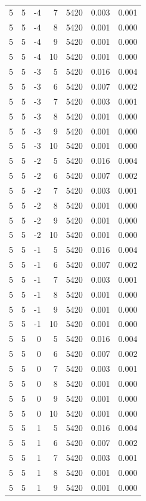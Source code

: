 \begin{table}
\begin{tabular}{rrrrrrr}
5 & 5 & -4 & 7 & 5420 & 0.003 & 0.001 \\
5 & 5 & -4 & 8 & 5420 & 0.001 & 0.000 \\
5 & 5 & -4 & 9 & 5420 & 0.001 & 0.000 \\
5 & 5 & -4 & 10 & 5420 & 0.001 & 0.000 \\
5 & 5 & -3 & 5 & 5420 & 0.016 & 0.004 \\
5 & 5 & -3 & 6 & 5420 & 0.007 & 0.002 \\
5 & 5 & -3 & 7 & 5420 & 0.003 & 0.001 \\
5 & 5 & -3 & 8 & 5420 & 0.001 & 0.000 \\
5 & 5 & -3 & 9 & 5420 & 0.001 & 0.000 \\
5 & 5 & -3 & 10 & 5420 & 0.001 & 0.000 \\
5 & 5 & -2 & 5 & 5420 & 0.016 & 0.004 \\
5 & 5 & -2 & 6 & 5420 & 0.007 & 0.002 \\
5 & 5 & -2 & 7 & 5420 & 0.003 & 0.001 \\
5 & 5 & -2 & 8 & 5420 & 0.001 & 0.000 \\
5 & 5 & -2 & 9 & 5420 & 0.001 & 0.000 \\
5 & 5 & -2 & 10 & 5420 & 0.001 & 0.000 \\
5 & 5 & -1 & 5 & 5420 & 0.016 & 0.004 \\
5 & 5 & -1 & 6 & 5420 & 0.007 & 0.002 \\
5 & 5 & -1 & 7 & 5420 & 0.003 & 0.001 \\
5 & 5 & -1 & 8 & 5420 & 0.001 & 0.000 \\
5 & 5 & -1 & 9 & 5420 & 0.001 & 0.000 \\
5 & 5 & -1 & 10 & 5420 & 0.001 & 0.000 \\
5 & 5 & 0 & 5 & 5420 & 0.016 & 0.004 \\
5 & 5 & 0 & 6 & 5420 & 0.007 & 0.002 \\
5 & 5 & 0 & 7 & 5420 & 0.003 & 0.001 \\
5 & 5 & 0 & 8 & 5420 & 0.001 & 0.000 \\
5 & 5 & 0 & 9 & 5420 & 0.001 & 0.000 \\
5 & 5 & 0 & 10 & 5420 & 0.001 & 0.000 \\
5 & 5 & 1 & 5 & 5420 & 0.016 & 0.004 \\
5 & 5 & 1 & 6 & 5420 & 0.007 & 0.002 \\
5 & 5 & 1 & 7 & 5420 & 0.003 & 0.001 \\
5 & 5 & 1 & 8 & 5420 & 0.001 & 0.000 \\
5 & 5 & 1 & 9 & 5420 & 0.001 & 0.000 \\

\end{tabular}
\end{table}
